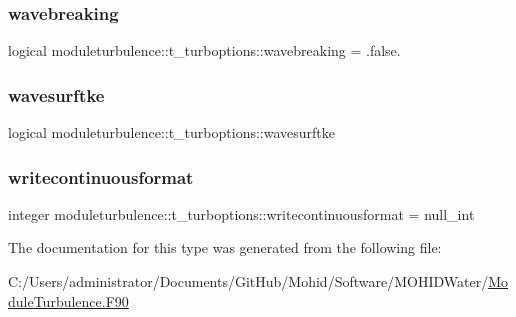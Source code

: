 \subsubsection{\texorpdfstring{wavebreaking}{wavebreaking}}
{\footnotesize\ttfamily logical moduleturbulence\+::t\+\_\+turboptions\+::wavebreaking = .false.\hspace{0.3cm}{\ttfamily [private]}}

\mbox{\label{structmoduleturbulence_1_1t__turboptions_a88b3982c9a8c1e2db1234e64b87b290c}} 
\subsubsection{\texorpdfstring{wavesurftke}{wavesurftke}}
{\footnotesize\ttfamily logical moduleturbulence\+::t\+\_\+turboptions\+::wavesurftke\hspace{0.3cm}{\ttfamily [private]}}

\mbox{\label{structmoduleturbulence_1_1t__turboptions_a826e75510c3aafb5b0a760d149aa6fa8}} 
\subsubsection{\texorpdfstring{writecontinuousformat}{writecontinuousformat}}
{\footnotesize\ttfamily integer moduleturbulence\+::t\+\_\+turboptions\+::writecontinuousformat = null\+\_\+int\hspace{0.3cm}{\ttfamily [private]}}



The documentation for this type was generated from the following file\+:\begin{DoxyCompactItemize}
\item 
C\+:/\+Users/administrator/\+Documents/\+Git\+Hub/\+Mohid/\+Software/\+M\+O\+H\+I\+D\+Water/\mbox{\hyperlink{_module_turbulence_8_f90}{Module\+Turbulence.\+F90}}\end{DoxyCompactItemize}
